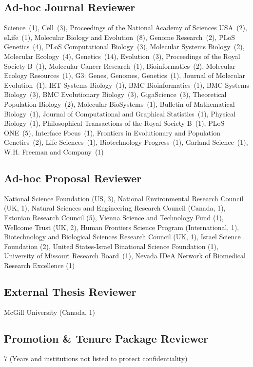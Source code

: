 \documentclass[11pt]{article}
\begin{document}
\subsection*{Ad-hoc Journal Reviewer}
{Science~(1)},
{Cell~(3)},
{Proceedings of the National Academy of Sciences USA~(2)},
{eLife~(1)},
{Molecular Biology and Evolution~(8)},
{Genome Research~(2)},
{PLoS Genetics~(4)},
{PLoS Computational Biology~(3)},
{Molecular Systems Biology~(2)},
{Molecular Ecology~(4)},
{Genetics~(14)}, 
{Evolution~(3)}, 
{Proceedings of the Royal Society B~(1)},
{Molecular Cancer Research~(1)},
{Bioinformatics~(2)},
{Molecular Ecology Resources~(1)},
{G3: Genes, Genomes, Genetics~(1)},
{Journal of Molecular Evolution~(1)},
{IET Systems Biology~(1)}, 
{BMC Bioinformatics~(1)},
{BMC Systems Biology~(3)}, 
{BMC Evolutionary Biology~(3)},
{GigaScience~(3)},
{Theoretical Population Biology~(2)},
{Molecular BioSystems~(1)},
{Bulletin of Mathematical Biology~(1)},
{Journal of Computational and Graphical Statistics~(1)},
{Physical Biology~(1)},
{Philosophical Transactions of the Royal Society B~(1)},
{PLoS ONE~(5)},
{Interface Focus~(1)},
{Frontiers in Evolutionary and Population Genetics~(2)},
{Life Sciences~(1)},
{Biotechnology Progress~(1)},
{Garland Science~(1)},
{W.H. Freeman and Company~(1)}

\subsection*{Ad-hoc Proposal Reviewer}
National Science Foundation (US, 3), National Environmental Research Council (UK, 1), Natural Sciences and Engineering Research Council (Canada, 1), Estonian Research Council (5), Vienna Science and Technology Fund (1),
Wellcome Trust (UK, 2), Human Frontiers Science Program (International, 1), Biotechnology and Biological Sciences Research Council (UK, 1), Israel Science Foundation (2), United States-Israel Binational Science Foundation (1), University of Missouri Research Board~(1), Nevada IDeA Network of Biomedical Research Excellence (1)

\subsection*{External Thesis Reviewer}
McGill University (Canada, 1)

\subsection*{Promotion \& Tenure Package Reviewer}
7 (Years and institutions not listed to protect confidentiality)
\end{document}
